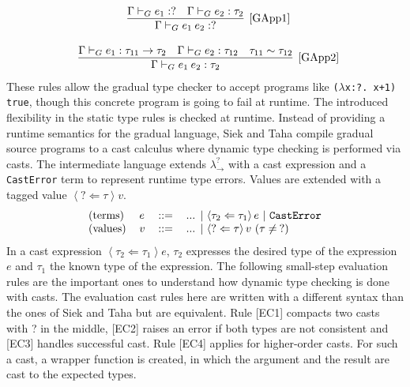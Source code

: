 \documentclass{article}
\newcommand\tcast[2]{\left\langle #1 \Leftarrow #2 \right\rangle }
\newcommand\gstlc[0]{$\lambda^?_{\rightarrow}$}
\newcommand\rulename[1]{\mathrm{\text{[#1]}}}
\newcommand\irname[1]{[#1]}
\newcommand\icode[1]{\texttt{#1}}
\begin{document}
\[
\begin{tabular} {c}

\infer[\rulename{GApp1}] 
{\Gamma \vdash_G e_1 \: e_2 : ? }
{\Gamma \vdash_G e_1 : ? \quad 
\Gamma \vdash_G e_2: \tau_2}

\\
\\

\infer[\rulename{GApp2}] 
{\Gamma \vdash_G e_1 \: e_2 : \tau_2 }
{\Gamma \vdash_G e_1 : \tau_{11} \rightarrow \tau_2 \quad 
\Gamma \vdash_G e_2: \tau_{12} \quad \tau_{11} \sim \tau_{12}}

\end{tabular}
\]
These rules allow the gradual type checker to accept programs like \icode{($\lambda$x:?. x+1) true}, though this concrete program is going to fail at runtime. The introduced flexibility in the static type rules is checked at runtime. Instead of providing a runtime semantics for the gradual language, Siek and Taha compile gradual source programs to a cast calculus where dynamic type checking is performed via casts. The intermediate language extends \gstlc \: with a cast expression and a \icode{CastError} term to represent runtime type errors. Values are extended with a tagged value $\tcast{?}{\tau}v$.
\[
\begin{tabular}{l l c l}
(terms) &$e$ &::= & ... $\mid$  $\tcast{\tau_2}{\tau_1}e$ $\mid$ $\texttt{CastError}$ \\
(values) &$v$ &::= & ... $\mid$  $\tcast{?}{\tau}v$ ($\tau \neq \: ?$)
\end{tabular}
\]
In a cast expression $\tcast{\tau_2}{\tau_1}e$, $\tau_2$ expresses the desired type of the expression $e$ and $\tau_1$ the known type of the expression.
The following small-step evaluation rules are the important ones to understand how dynamic type checking is done with casts. The evaluation cast rules here are written with a different syntax than the ones of Siek and Taha but are equivalent. Rule \irname{EC1} compacts two casts with ? in the middle, \irname{EC2} raises an error if both types are not consistent and \irname{EC3} handles successful cast. Rule \irname{EC4} applies for higher-order casts. For such a cast, a wrapper function is created, in which the argument and the result are cast to the expected types.
\end{document}
